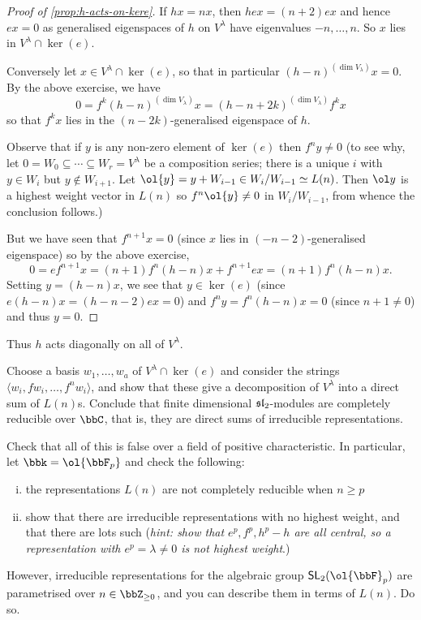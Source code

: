 \begin{proof}[Proof of \cref{prop:h-acts-on-kere}]
    If $hx = nx$, then $hex=(n+2)ex$ and hence $ex=0$ as generalised eigenspaces
    of $h$ on $V^\lambda$ have eigenvalues $-n, \ldots, n$. So $x$ lies in
    $V^\lambda\cap \ker(e)$.

    Conversely let $x\in V^\lambda\cap \ker(e)$, so that in particular $(h-n)^{(\dim V_\lambda)} x
    = 0$. By the above exercise, we have \[0 = f^k(h-n)^{(\dim V_\lambda)} x =
    (h-n+2k)^{(\dim V_\lambda)} f^k x\]
    so that $f^k x$ lies in the $(n-2k)$-generalised eigenspace of $h$.

    Observe that if $y$ is any non-zero element of $\ker(e)$ then $f^n y \neq
    0$ (to see why, let $0=W_0\subseteq \cdots \subseteq  W_r= V^\lambda$ be a composition
    series; there is a unique $i$ with $y\in W_i$ but $y\notin W_{i+1}$. Let
    $\ol{y}=y+W_{i-1}\in W_i/W_{i-1}\simeq L(n)$. Then $\ol y$ is a highest
    weight vector in $L(n)$ so $f^n \ol{y}\neq 0$ in $W_i/W_{i-1}$, from whence
    the conclusion follows.)

    But we have seen that $f^{n+1}x = 0$ (since $x$
    lies in $(-n-2)$-generalised eigenspace) so by the above exercise, 
    \[0=ef^{n+1}x = (n+1)f^n (h-n) x + f^{n+1}ex = (n+1)f^n(h-n)x.\]
    Setting $y=(h-n)x$, we see that $y\in \ker(e)$ (since $e(h-n)x=(h-n-2)ex
    =0$) and $f^ny = f^n(h-n)x = 0$ (since $n+1\neq 0$) and thus $y= 0$.
\end{proof}

Thus $h$ acts diagonally on all of $V^\lambda$.

\begin{exercise}
Choose a basis $w_1,\ldots, w_a$ of $V^\lambda \cap \ker(e)$ and consider the
strings $\langle w_i, fw_i, \ldots, f^n w_i\rangle$, and show that these give a
decomposition of $V^\lambda$ into a direct sum of $L(n)$s. Conclude that finite
dimensional $\sl_2$-modules are completely reducible over $\bbC$, that is, they
are direct sums of irreducible representations.
\end{exercise}

\begin{exercise}
    Check that all of this is false over a field of positive characteristic. In
    particular, let $\bbk = \ol{\bbF_p}$ and check the following:
    \begin{enumerate}[(i)]
        \item the representations $L(n)$ are not completely reducible when $n\geq p$
        \item show that there are irreducible representations with no highest
            weight, and that there are lots such (\emph{hint: show that
            $e^p, f^p, h^p-h$ are all central, so a representation with
            $e^p=\lambda\neq 0$ is not highest weight}.)
    \end{enumerate}
    However, irreducible representations for the algebraic group
    $\sf{SL}_2(\ol{\bbF}_p)$ are parametrised over $n\in \bbZ_{\geq 0}$, and you
    can describe them in terms of $L(n)$. Do so.
\end{exercise}

